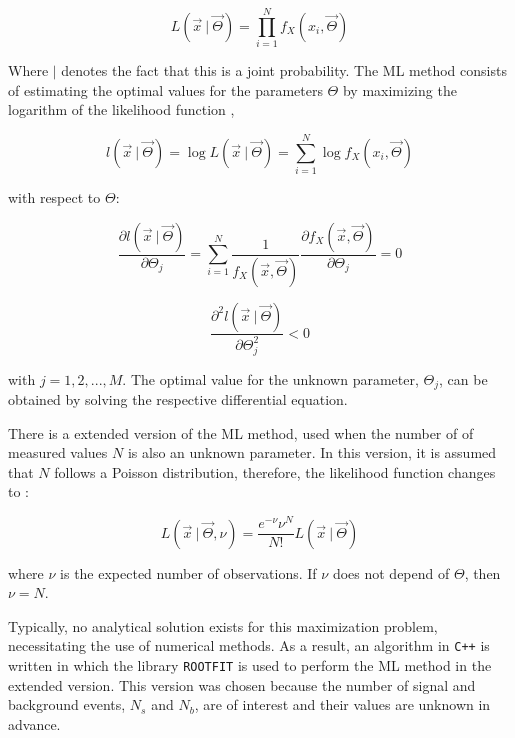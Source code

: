 \begin{equation}
L(\vec{x} \ | \ \vec{\Theta}) = \prod_{i = 1}^{N} f_X(x_i, \vec{\Theta}) 
\end{equation}

Where $|$ denotes the fact that this is a joint probability. The ML method consists of estimating the optimal values for the parameters $\Theta$ by maximizing the logarithm of the likelihood function \cite{mejia2012medida},

\begin{equation}
	l(\vec{x} \ | \ \vec{\Theta}) = \log L(\vec{x} \ | \ \vec{\Theta}) = \sum_{i = 1}^{N} \log f_X(x_i, \vec{\Theta})
\end{equation} 

with respect to $\Theta$:

\begin{equation}
	\frac{\partial{l(\vec{x} \ | \ \vec{\Theta})}}{\partial \Theta_j} = \sum_{i = 1}^{N} \frac{1}{f_X(\vec{x}, \vec{\Theta})} \frac{\partial{f_X(\vec{x}, \vec{\Theta})}}{\partial \Theta_j} = 0
\end{equation} 

\begin{equation}
	\frac{\partial^2{l(\vec{x} \ | \ \vec{\Theta})}}{\partial \Theta_j ^2} < 0
	\label{eq:ml}
\end{equation}

with $ j = 1, 2, ..., M$. The optimal value for the unknown parameter, $\Theta_j$, can be obtained by solving the respective differential equation.

There is a extended version of the ML method, used when the number of of measured values $N$ is also an unknown parameter. In this version, it is assumed that $N$ follows a Poisson distribution, therefore, the likelihood function changes to \cite{bonanomi2021response}:

\begin{equation}
	L(\vec{x} \ | \ \vec{\Theta}, \nu) = \frac{e^{-\nu} \nu^N}{N!} L(\vec{x} \ | \ \vec{\Theta})
\end{equation}

where $\nu$ is the expected number of observations. 
If $\nu$ does not depend of $\Theta$, then $\nu = N$. 

Typically, no analytical solution exists for this maximization problem, necessitating the use of numerical methods. As a result, an algorithm in \verb|C++| is written in which the library \verb|ROOTFIT| is used to perform the ML method in the extended version. This version was chosen because the number of signal and background events, $N_s$ and $N_b$, are of interest and their values are unknown in advance.

